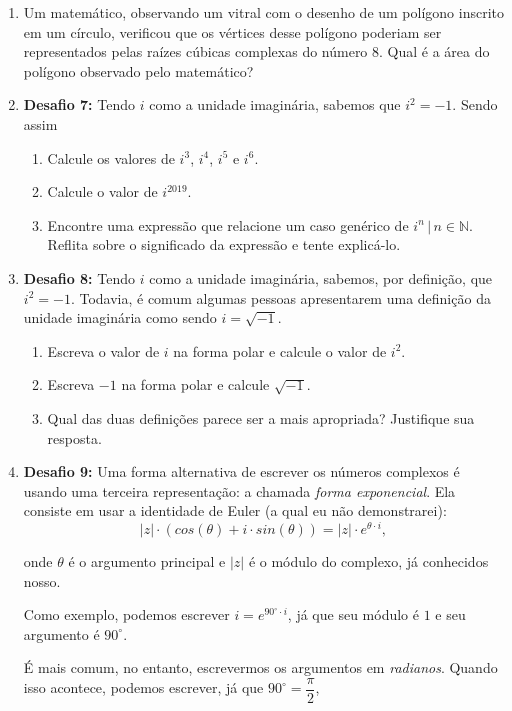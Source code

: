 \documentclass[a4paper, 11pt]{article}
\begin{document}
\begin{enumerate}
\item Um matemático, observando um vitral com o desenho de um polígono inscrito em um círculo, verificou que os vértices desse polígono poderiam ser representados pelas raízes cúbicas complexas do número 8. Qual é a área do polígono observado pelo matemático?


\item \textbf{Desafio 7:} Tendo $i$ como a unidade imaginária, sabemos que $i^2 = -1$. Sendo assim
	\begin{enumerate}
	\item Calcule os valores de $i^3$, $i^4$, $i^5$ e $i^6$.
	\item Calcule o valor de $i^{2019}$.
	\item Encontre uma expressão que relacione um caso genérico de $i^n \, | \, n \in \mathbb{N}$. Reflita sobre o significado da expressão e tente explicá-lo.
	\end{enumerate}

\item \textbf{Desafio 8:} Tendo $i$ como a unidade imaginária, sabemos, por definição, que $i^2 = -1$. Todavia, é comum algumas pessoas apresentarem uma definição da unidade imaginária como sendo $i = \sqrt{-1}$.
	\begin{enumerate}
	\item Escreva o valor de $i$ na forma polar e calcule o valor de $i^2$. 
	\item Escreva $-1$ na forma polar e calcule $\sqrt{-1}$.
	\item Qual das duas definições parece ser a mais apropriada? Justifique sua resposta.
	\end{enumerate}

\item \textbf{Desafio 9:} Uma forma alternativa de escrever os números complexos é usando uma terceira representação: a chamada \textit{forma exponencial}. Ela consiste em usar a identidade de Euler (a qual eu não demonstrarei):
	$$ |z|\cdot ( cos(\theta) + i\cdot sin(\theta) ) = |z|\cdot e^{\theta\cdot i} ,$$
	
	onde $\theta$ é o argumento principal e $|z|$ é o módulo do complexo, já conhecidos nosso.
	
Como exemplo, podemos escrever $i = e^{ 90^{\circ} \cdot i} $, já que seu módulo é $1$ e seu argumento é $90^{\circ}$.

É mais comum, no entanto, escrevermos os argumentos em \textit{radianos}. Quando isso acontece, podemos escrever, já que $90^{\circ} = \dfrac{\pi}{2}$, 


\end{enumerate}
\end{document}
